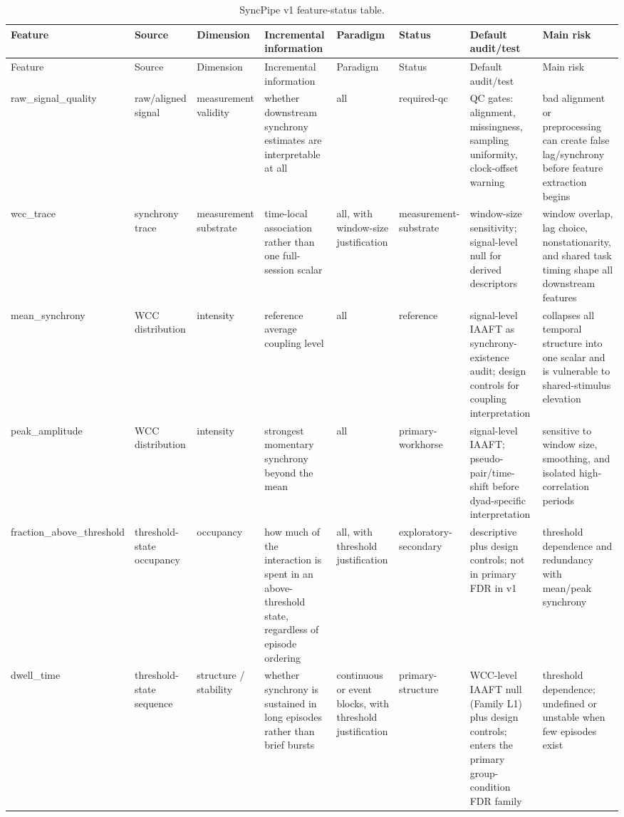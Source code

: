 \begin{longtable}{p{}p{}p{}p{}p{}p{}p{}p{}}
\caption{SyncPipe v1 feature-status table.}\label{tab:multisync_feature_status}\\
\toprule
Feature & Source & Dimension & Incremental information & Paradigm & Status & Default audit/test & Main risk \\
\midrule
\endfirsthead
\toprule
Feature & Source & Dimension & Incremental information & Paradigm & Status & Default audit/test & Main risk \\
\midrule
\endhead
raw\_signal\_quality & raw/aligned signal & measurement validity & whether downstream synchrony estimates are interpretable at all & all & required-qc & QC gates: alignment, missingness, sampling uniformity, clock-offset warning & bad alignment or preprocessing can create false lag/synchrony before feature extraction begins \\
wcc\_trace & synchrony trace & measurement substrate & time-local association rather than one full-session scalar & all, with window-size justification & measurement-substrate & window-size sensitivity; signal-level null for derived descriptors & window overlap, lag choice, nonstationarity, and shared task timing shape all downstream features \\
mean\_synchrony & WCC distribution & intensity & reference average coupling level & all & reference & signal-level IAAFT as synchrony-existence audit; design controls for coupling interpretation & collapses all temporal structure into one scalar and is vulnerable to shared-stimulus elevation \\
peak\_amplitude & WCC distribution & intensity & strongest momentary synchrony beyond the mean & all & primary-workhorse & signal-level IAAFT; pseudo-pair/time-shift before dyad-specific interpretation & sensitive to window size, smoothing, and isolated high-correlation periods \\
fraction\_above\_threshold & threshold-state occupancy & occupancy & how much of the interaction is spent in an above-threshold state, regardless of episode ordering & all, with threshold justification & exploratory-secondary & descriptive plus design controls; not in primary FDR in v1 & threshold dependence and redundancy with mean/peak synchrony \\
dwell\_time & threshold-state sequence & structure / stability & whether synchrony is sustained in long episodes rather than brief bursts & continuous or event blocks, with threshold justification & primary-structure & WCC-level IAAFT null (Family L1) plus design controls; enters the primary group-condition FDR family & threshold dependence; undefined or unstable when few episodes exist \\

\end{longtable}
